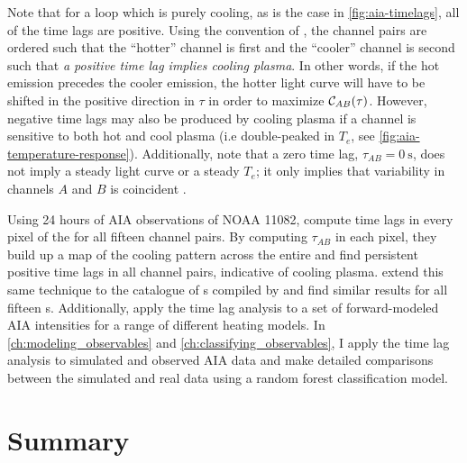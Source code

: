 Note that for a loop which is purely cooling, as is the case in \autoref{fig:aia-timelags}, all of the time lags are positive. Using the convention of \citet{viall_evidence_2012}, the channel pairs are ordered such that the ``hotter'' channel is first and the ``cooler'' channel is second such that \textit{a positive time lag implies cooling plasma}. In other words, if the hot emission precedes the cooler emission, the hotter light curve will have to be shifted in the positive direction in $\tau$ in order to maximize $\mathcal{C}_{AB}(\tau)$. However, negative time lags may also be produced by cooling plasma if a channel is sensitive to both hot and cool plasma (i.e double-peaked in $T_e$, see \autoref{fig:aia-temperature-response}). Additionally, note that a zero time lag, $\tau_{AB}=\SI{0}{\second}$, does not imply a steady light curve or a steady $T_e$; it only implies that variability in channels $A$ and $B$ is coincident \citep{viall_transition_2015,viall_signatures_2016}.

Using 24 hours of AIA observations of \AR{} NOAA 11082, \citet{viall_evidence_2012} compute time lags in every pixel of the \AR{} for all fifteen channel pairs. By computing $\tau_{AB}$ in each pixel, they build up a map of the cooling pattern across the entire \AR{} and find persistent positive time lags in all channel pairs, indicative of cooling plasma. \citet{viall_survey_2017} extend this same technique to the catalogue of \AR s compiled by \citet{warren_systematic_2012} and find similar results for all fifteen \AR s. Additionally, \citet{bradshaw_patterns_2016} apply the time lag analysis to a set of forward-modeled AIA intensities for a range of different heating models. In \autoref{ch:modeling_observables} and \autoref{ch:classifying_observables}, I apply the time lag analysis to simulated and observed AIA data and make detailed comparisons between the simulated and real data using a random forest classification model.

\section{Summary}

